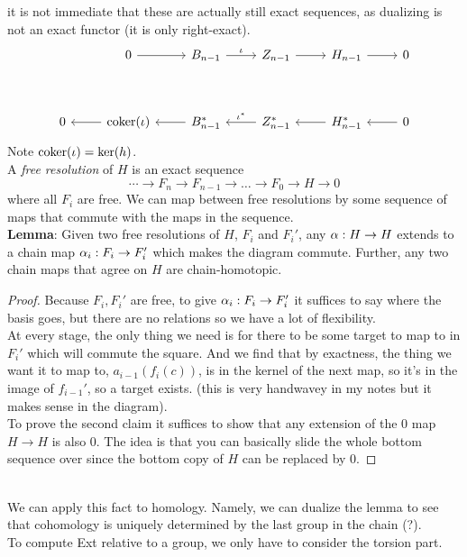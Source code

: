 \documentclass{amsart}
\begin{document}
	it is not immediate that these are actually still exact sequences, as dualizing is not an exact functor (it is only right-exact). 
	$$
	\begin{tikzcd}
		& 0 & {B_{n-1}} & {Z_{n-1}} & {H_{n-1}} & 0 \\
		\\
		0 & {\coker(\iota)} & {B_{n-1}^*} & {Z_{n-1}^*} & {H^*_{n-1}} & 0
		\arrow[from=1-2, to=1-3]
		\arrow["\iota", from=1-3, to=1-4]
		\arrow[from=1-4, to=1-5]
		\arrow[from=1-5, to=1-6]
		\arrow[from=3-2, to=3-1]
		\arrow[from=3-3, to=3-2]
		\arrow["{\iota^*}"', from=3-4, to=3-3]
		\arrow[from=3-5, to=3-4]
		\arrow[from=3-6, to=3-5]
	\end{tikzcd}
	$$
	Note $\operatorname{coker}(\iota) = \ker(h)$.\\
	
	A \textit{free resolution} of $H$ is an exact sequence 
	$$
	\cdots \to F_n \to F_{n-1} \to \dots \to F_0 \to H \to 0
	$$
	where all $F_i$ are free. We can map between free resolutions by some sequence of maps that commute with the maps in the sequence.\\
	
	\textbf{Lemma}: Given two free resolutions of $H$, $F_i$ and $F_i'$, any $\alpha:H\to H$ extends to a chain map $\alpha_i:F_i\to F_i'$ which makes the diagram commute. Further, any two chain maps that agree on $H$ are chain-homotopic.
	\begin{proof}
		Because $F_i,F_i'$ are free, to give $\alpha_i:F_i\to F_i'$ it suffices to say where the basis goes, but there are no relations so we have a lot of flexibility.\\
		
		At every stage, the only thing we need is for there to be some target to map to in $F_i'$ which will commute the square. And we find that by exactness, the thing we want it to map to, $a_{i-1}(f_i(c))$, is in the kernel of the next map, so it's in the image of $f_{i-1}'$, so a target exists. (this is very handwavey in my notes but it makes sense in the diagram).\\
		
		To prove the second claim it suffices to show that any extension of the 0 map $H\to H$ is also 0. The idea is that you can basically slide the whole bottom sequence over since the bottom copy of $H$ can be replaced by 0.
	\end{proof}\\
	
	We can apply this fact to homology. Namely, we can dualize the lemma to see that cohomology is uniquely determined by the last group in the chain (?).\\
	
	To compute Ext relative to a group, we only have to consider the torsion part.
	
\end{document}
